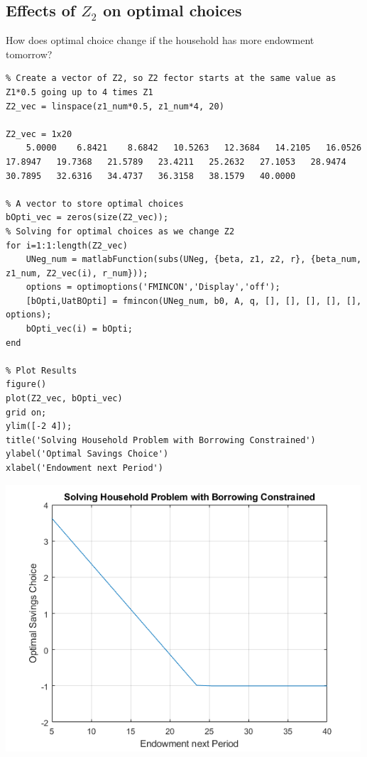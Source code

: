 \documentclass[
]{book}
\begin{document}
\hypertarget{effects-of-z_2-on-optimal-choices}{%
\subsection{\texorpdfstring{Effects of \(Z_2\) on optimal choices}{Effects of Z\_2 on optimal choices}}\label{effects-of-z_2-on-optimal-choices}}

How does optimal choice change if the household has more endowment
tomorrow?

\begin{verbatim}
% Create a vector of Z2, so Z2 fector starts at the same value as Z1*0.5 going up to 4 times Z1
Z2_vec = linspace(z1_num*0.5, z1_num*4, 20)

Z2_vec = 1x20    
    5.0000    6.8421    8.6842   10.5263   12.3684   14.2105   16.0526   17.8947   19.7368   21.5789   23.4211   25.2632   27.1053   28.9474   30.7895   32.6316   34.4737   36.3158   38.1579   40.0000

% A vector to store optimal choices
bOpti_vec = zeros(size(Z2_vec));
% Solving for optimal choices as we change Z2
for i=1:1:length(Z2_vec)
    UNeg_num = matlabFunction(subs(UNeg, {beta, z1, z2, r}, {beta_num, z1_num, Z2_vec(i), r_num}));
    options = optimoptions('FMINCON','Display','off');
    [bOpti,UatBOpti] = fmincon(UNeg_num, b0, A, q, [], [], [], [], [], options);
    bOpti_vec(i) = bOpti;
end

% Plot Results
figure()
plot(Z2_vec, bOpti_vec)
grid on;
ylim([-2 4]);
title('Solving Household Problem with Borrowing Constrained')
ylabel('Optimal Savings Choice')
xlabel('Endowment next Period')
\end{verbatim}

\includegraphics[width=5.20833in,height=\textheight]{img/household_borrow_constrained_images/figure_0.png}
\end{document}
